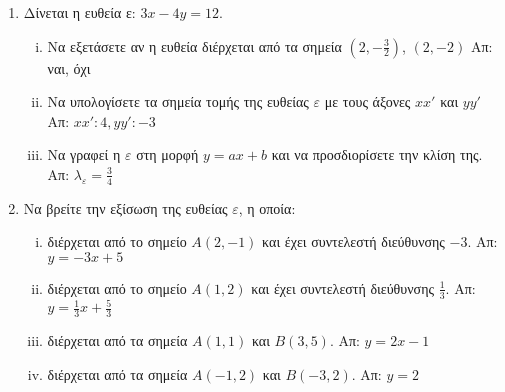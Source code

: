 


\pagestyle{vangelis}



\begin{center}
  \minibox{\large\bfseries \textcolor{Col1}{Ευθείες}}
\end{center}

\vspace{\baselineskip}

\begin{enumerate}
  \item  Δίνεται η ευθεία ε:  $ 3x - 4y = 12 $.
    \begin{enumerate}[i)]
      \item Να εξετάσετε αν η ευθεία διέρχεται από τα σημεία $\left(2,- \frac{3}{2}
        \right)$, $ (2,-2) $ \hfill Απ:  ναι, όχι 
      \item  Να υπολογίσετε τα σημεία τομής της ευθείας $ \varepsilon $  
        με τους άξονες  $ xx' $  και  $ yy' $ \hfill Απ: $ xx': 4, yy':-3 $ 
      \item Να γραφεί η $ \varepsilon $ στη μορφή $ y=ax+b $ και να 
        προσδιορίσετε την κλίση της. 
        \hfill Απ: $ \lambda_{\varepsilon} = \frac{3}{4} $ 
    \end{enumerate}


  \item  Να βρείτε την εξίσωση της ευθείας  $ \varepsilon $, η οποία: 
    \begin{enumerate}[i)]
      \item διέρχεται από το σημείο  $ A(2,-1) $ και έχει συντελεστή διεύθυνσης 
        $ -3 $.  \hfill Απ: $ y = -3x+5 $ 
      \item διέρχεται από το σημείο  $ A(1,2) $ και έχει συντελεστή διεύθυνσης 
        $ \frac{1}{3} $.  \hfill Απ: $ y = \frac{1}{3} x + \frac{5}{3} $ 
      \item διέρχεται από τα σημεία  $ A(1,1) $  και  $ B(3,5) $. 
    \hfill Απ: $ y=2x-1 $ 
      \item διέρχεται από τα σημεία  $ A(-1,2) $  και  $ B(-3,2) $. 
    \hfill Απ: $ y=2 $ 
    \end{enumerate}


\end{enumerate}
